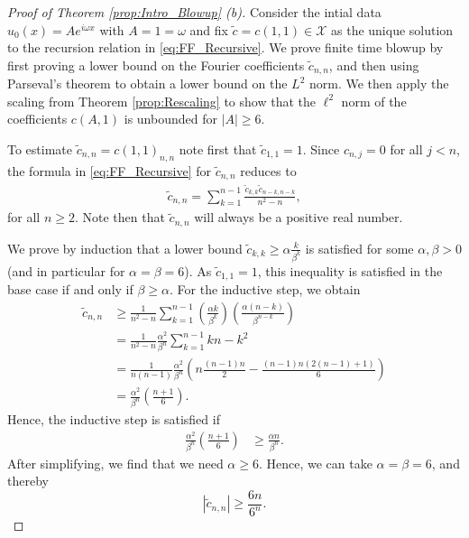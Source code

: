\documentclass{article}
\newcommand{\cX}{\mathcal{X}}
\begin{document}
 \begin{proof}[Proof of Theorem \ref{prop:Intro_Blowup} (b)]
 	Consider the intial data $ u_0(x) = A e^{i \omega x}$ with $A = 1 = \omega$ and fix $\tilde{c} = c(1,1)   \in \cX$ as the unique solution to the recursion relation in \eqref{eq:FF_Recursive}.  
 	We prove finite time blowup by first  proving a lower bound on the  Fourier coefficients $\tilde{c}_{n,n}$, and then using  Parseval's theorem to obtain a lower bound on the $L^2$ norm.  
 	We then apply the scaling from Theorem \ref{prop:Rescaling} to show that the $\ell^2$ norm of the coefficients $c(A,1)$ is unbounded for $ |A| \geq 6$. 
 	
 	To estimate $ \tilde{c}_{n,n}=c(1,1)_{n,n}$ note first that $ \tilde{c}_{1,1} = 1$. 
 	Since $c_{n,j} = 0$ for all $ j< n$,  the formula in \eqref{eq:FF_Recursive} for $ \tilde{c}_{n,n}$ reduces to  
 	\begin{align} \label{eq:CnnFormula}
 	\tilde{c}_{n,n} = \sum_{k=1}^{n-1} \frac{\tilde{c}_{k,k} \tilde{c}_{n-k,n-k}}{n^2 -n}, 
 	\end{align}
 	for all $ n \geq 2$.
 	Note then that $\tilde{c}_{n,n}$ will  always be a positive real number. 
 	
 	We prove by induction that a lower bound $  \tilde{c}_{k,k}  \geq \alpha \frac{ k }{\beta^k}$ is satisfied for some $ \alpha, \beta >0$ (and in particular for $ \alpha=\beta = 6$). 
 	As $\tilde{c}_{1,1}=1$, this inequality is satisfied in the base case if and only if $\beta \geq \alpha$. 
 	For the inductive step, we obtain 
 	\begin{align*}
 	\tilde{c}_{n,n} &\geq  
 	\frac{1}{n^2-n} 
 	\sum_{k=1}^{n-1} 
 	\left(  
 	\frac{\alpha k}{\beta^k}
 	\right)
 	\left(  
 	\frac{\alpha (n-k)}{\beta^{n-k}}
 	\right) \\
 	& = 
 	\frac{1}{n^2-n}  
 	\frac{\alpha^2}{\beta^n}
 	\sum_{k=1}^{n-1}  kn - k^2 \\
 	& = 
 	\frac{1}{n(n-1)}  
 	\frac{\alpha^2}{\beta^n} 
 	\left(
 	n \frac{(n-1)n}{2} - 
 	\frac{(n-1)n(2(n-1)+1)}{6}
 	\right) \\
 	& = 
 	\frac{\alpha^2}{\beta^n} 
 	\left(
 	\frac{n+1}{6}
 	\right) .
 	\end{align*}
 	Hence,  the inductive step is satisfied if 
 	\begin{align*}
 	\frac{\alpha^2}{\beta^n} 
 	\left(
 	\frac{n+1}{6}
 	\right) 
 	&	\geq \frac{\alpha n}{\beta^n} . 
 	\end{align*}
 	After simplifying, we find that we need $\alpha \geq 6$. 
 	Hence, we can take $ \alpha = \beta = 6$, and thereby 
 	\[
 	|\tilde{c}_{n,n}| \geq \frac{6n}{6^n}. 
 	\]
 	

\end{proof}
\end{document}

